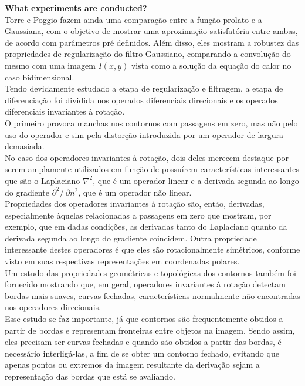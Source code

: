 \begin{enumerate}
\begin{enumerate}[label*=\arabic*.]
    \textbf{What experiments are conducted?}\\
    Torre e Poggio fazem ainda uma comparação entre a função prolato e a Gaussiana, com o objetivo de mostrar uma aproximação satisfatória entre ambas, de acordo com parâmetros pré definidos. Além disso, eles mostram a robustez das propriedades de regularização do filtro Gaussiano, comparando a convolução do mesmo com uma imagem $I(x, y)$ vista como a solução da equação do calor no caso bidimensional.\\
    Tendo devidamente estudado a etapa de regularização e filtragem, a etapa de diferenciação foi dividida nos operados diferenciais direcionais e os operados diferenciais invariantes à rotação.\\
    O primeiro provoca manchas nos contornos com passagens em zero, mas não pelo uso do operador e sim pela distorção introduzida por um operador de largura demasiada.\\
    No caso dos operadores invariantes à rotação, dois deles merecem destaque por serem amplamente utilizados em função de possuírem características interessantes que são o Laplaciano $\nabla ^2$, que é um operador linear e a derivada segunda ao longo do gradiente $\partial^2 /\ \partial n^2$, que é um operador não linear.\\
    Propriedades dos operadores invariantes à rotação são, então, derivadas, especialmente àquelas relacionadas a passagens em zero que mostram, por exemplo, que em dadas condições, as derivadas tanto do Laplaciano quanto da derivada segunda ao longo do gradiente coincidem. Outra propriedade interessante destes operadores é que eles são rotacionalmente simétricos, conforme visto em suas respectivas representações em coordenadas polares.\\
    Um estudo das propriedades geométricas e topológicas dos contornos também foi fornecido mostrando que, em geral, operadores invariantes à rotação detectam bordas mais suaves, curvas fechadas, características normalmente não encontradas nos operadores direcionais.\\
    Esse estudo se faz importante, já que contornos são frequentemente obtidos a partir de bordas e representam fronteiras entre objetos na imagem. Sendo assim, eles precisam ser curvas fechadas e quando são obtidos a partir das bordas, é necessário interligá-las, a fim de se obter um contorno fechado, evitando que apenas pontos ou extremos da imagem resultante da derivação sejam a representação das bordas que está se avaliando.
    

\end{enumerate}
\end{enumerate}
